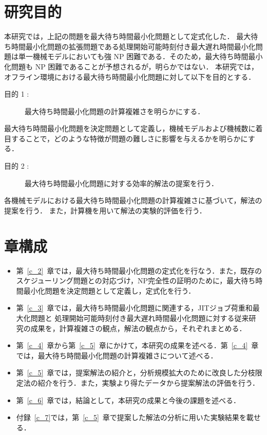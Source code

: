 \documentclass[12pt]{optlab-bachelor}
\begin{document}
\section{研究目的}
本研究では，上記の問題を最大待ち時間最小化問題として定式化した．
最大待ち時間最小化問題の拡張問題である処理開始可能時刻付き最大遅れ時間最小化問題は単一機械モデルにおいても強 NP  困難である．そのため，最大待ち時間最小化問題も NP 困難であることが予想されるが，明らかではない．
本研究では，オフライン環境における最大待ち時間最小化問題に対して以下を目的とする．
\begin{description}
  \item[目的 1 :]
  最大待ち時間最小化問題の計算複雑さを明らかにする．
\end{description}

最大待ち時間最小化問題を決定問題として定義し，機械モデルおよび機械数に着目することで，どのような特徴が問題の難しさに影響を与えるかを明らかにする．

\begin{description}
  \item[目的 2 :]
  最大待ち時間最小化問題に対する効率的解法の提案を行う．
\end{description}

各機械モデルにおける最大待ち時間最小化問題の計算複雑さに基づいて，解法の提案を行う．
また，計算機を用いて解法の実験的評価を行う．

\section{章構成}

\begin{itemize}
  \item 第~\ref{c_2}~章では，最大待ち時間最小化問題の定式化を行なう．また，既存のスケジューリング問題との対応づけ，NP完全性の証明のために，最大待ち時間最小化問題を決定問題として定義し，定式化を行う．
  \item 第~\ref{c_3}~章では，最大待ち時間最小化問題に関連する，JITジョブ荷重和最大化問題と
  処理開始可能時刻付き最大遅れ時間最小化問題に対する従来研究の成果を，計算複雑さの観点，解法の観点から，それぞれまとめる．
  \item 第~\ref{c_4}~章から第~\ref{c_5}~章にかけて，本研究の成果を述べる．第~\ref{c_4}~章では，最大待ち時間最小化問題の計算複雑さについて述べる．
  \item 第~\ref{c_5}~章では，提案解法の紹介と，分析規模拡大のために改良した分枝限定法の紹介を行う．また，実験より得たデータから提案解法の評価を行う．
  \item 第~\ref{c_6}~章では，結論として，本研究の成果と今後の課題を述べる．
  \item 付録~\ref{c_7}では，第~\ref{c_5}~章で提案した解法の分析に用いた実験結果を載せる．
\end{itemize}
\end{document}
